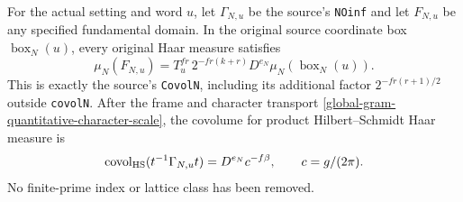 \begin{theorem}
\label{global-gram-haar-covolume}
For the actual setting and word $u$, let $\Gamma_{N,u}$ be the
source's \texttt{NOinf} and let $F_{N,u}$ be any specified
fundamental domain.  In the original source coordinate box
$\operatorname{box}_N(u)$, every original Haar measure satisfies
\begin{equation}\label{global-gram-haar-source-covolume}
 \mu_N(F_{N,u})
  =T_u^{fr}\,2^{-fr(k+r)}D^{e_N}
                               \mu_N(\operatorname{box}_N(u)).
\end{equation}
This is exactly the source's \texttt{CovolN}, including its
additional factor $2^{-fr(r+1)/2}$ outside \texttt{covolN}.
After the frame and character transport
\eqref{global-gram-quantitative-character-scale}, the covolume
for product Hilbert--Schmidt Haar measure is
\begin{equation}\label{global-gram-haar-transported-covolume}
 \operatorname{covol}_{\rm HS}(t^{-1}\Gamma_{N,u}t)
                        =D^{e_N}c^{-f\beta},\qquad c=g/(2\pi).
\end{equation}
No finite-prime index or lattice class has been removed.
\end{theorem}
